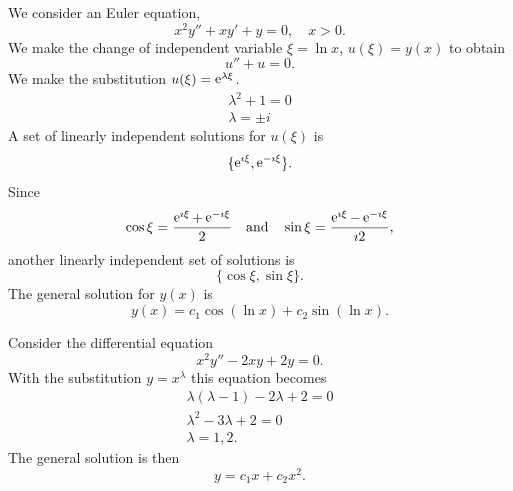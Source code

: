 {%
\begin{Solution}
  \label{solution x2y+xy+y}
  We consider an Euler equation,
  \[
  x^2 y'' + x y' + y = 0, \quad x > 0.
  \]
  We make the change of independent variable $\xi = \ln x$, $u(\xi) = y(x)$
  to obtain
  \[
  u'' + u = 0.
  \]
  We make the substitution $u(\xi) = \mathop{\mathrm{e}}\nolimits^{\lambda \xi}$.
  \begin{gather*}
    \lambda^2 + 1 = 0 \\
    \lambda = \pm i
  \end{gather*}
  A set of linearly independent solutions for $u(\xi)$ is
  \[
  \{ \mathop{\mathrm{e}}\nolimits^{\imath \xi}, \mathop{\mathrm{e}}\nolimits^{-\imath \xi} \}.
  \]
  Since
  \[
  \cos \xi = \frac{\mathop{\mathrm{e}}\nolimits^{\imath \xi} + \mathop{\mathrm{e}}\nolimits^{-\imath \xi} }{2} \quad \mathrm{and} \quad
  \sin \xi = \frac{\mathop{\mathrm{e}}\nolimits^{\imath \xi} - \mathop{\mathrm{e}}\nolimits^{-\imath \xi} }{\imath 2},
  \]
  another linearly independent set of solutions is
  \[
  \{ \cos \xi, \sin \xi \}.
  \]
  The general solution for $y(x)$ is
  \[
  \boxed{
    y(x) = c_1 \cos( \ln x ) + c_2 \sin( \ln x ).
    }
  \]
\end{Solution}





\begin{Solution}
  \label{solution x2y-2xy+2y}
  Consider the differential equation
  \[ 
  x^2 y'' - 2 x y + 2 y = 0. 
  \]
  With the substitution $y = x^{\lambda}$ this equation becomes
  \begin{gather*}
    \lambda(\lambda-1) - 2 \lambda + 2 = 0 \\
    \lambda^2 - 3 \lambda + 2 = 0 \\
    \lambda = 1, 2.
  \end{gather*}
  The general solution is then
  \[ 
  \boxed{ y = c_1 x + c_2 x^2.} 
  \]
\end{Solution}



}
